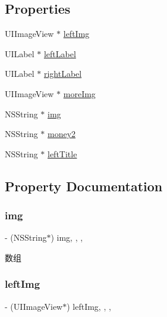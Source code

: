 \subsection*{Properties}
\begin{DoxyCompactItemize}
\item 
U\+I\+Image\+View $\ast$ \mbox{\hyperlink{interface_mine_cell_a2db3f90861a53df32c99e406dc08a1c9}{left\+Img}}
\item 
U\+I\+Label $\ast$ \mbox{\hyperlink{interface_mine_cell_a11c01d5e75b3cc89c899675824557158}{left\+Label}}
\item 
U\+I\+Label $\ast$ \mbox{\hyperlink{interface_mine_cell_a066382eb97dcf9040ce518f9d50a3e33}{right\+Label}}
\item 
U\+I\+Image\+View $\ast$ \mbox{\hyperlink{interface_mine_cell_ae5e108891af1741c1d75022346e285c4}{more\+Img}}
\item 
N\+S\+String $\ast$ \mbox{\hyperlink{interface_mine_cell_a1ee7ebb689fb0e4ef7e5cf54f1fff67f}{img}}
\item 
N\+S\+String $\ast$ \mbox{\hyperlink{interface_mine_cell_a2bf67f2fde7f2f366f9d1c60af4fd5d7}{money2}}
\item 
N\+S\+String $\ast$ \mbox{\hyperlink{interface_mine_cell_abbe5a9c0166ae2fab9239a2d56cd3053}{left\+Title}}
\end{DoxyCompactItemize}


\subsection{Property Documentation}
\mbox{\label{interface_mine_cell_a1ee7ebb689fb0e4ef7e5cf54f1fff67f}} 
\subsubsection{\texorpdfstring{img}{img}}
{\footnotesize\ttfamily -\/ (N\+S\+String$\ast$) img\hspace{0.3cm}{\ttfamily [read]}, {\ttfamily [write]}, {\ttfamily [nonatomic]}, {\ttfamily [strong]}}

数组 \mbox{\label{interface_mine_cell_a2db3f90861a53df32c99e406dc08a1c9}} 
\subsubsection{\texorpdfstring{left\+Img}{leftImg}}
{\footnotesize\ttfamily -\/ (U\+I\+Image\+View$\ast$) left\+Img\hspace{0.3cm}{\ttfamily [read]}, {\ttfamily [write]}, {\ttfamily [nonatomic]}, {\ttfamily [strong]}}


